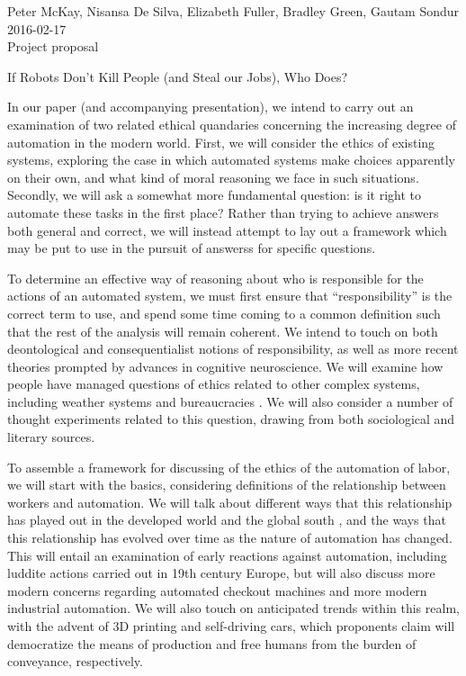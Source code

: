 \documentclass{article}
\begin{document}

\begin{center}
Peter McKay, Nisansa De Silva, Elizabeth Fuller, Bradley Green, Gautam Sondur\\
2016-02-17\\
Project proposal\\
\end{center}

\bigskip
{\Large If Robots Don’t Kill People (and Steal our Jobs), Who Does?}

In our paper (and accompanying presentation), we intend to carry out an 
examination of two related ethical quandaries concerning the increasing 
degree\cite{frey2013future} of automation in the modern world.  First, 
we will consider the ethics of existing systems, exploring the case in 
which automated systems make choices apparently
\cite{johnson2008computers} on their own, and what kind of moral 
reasoning we face in such situations.  Secondly, we will ask a somewhat 
more fundamental question: is it right to automate these tasks in the 
first place?  Rather than trying to achieve answers both general and 
correct, we will instead attempt to lay out a framework which may be 
put to use in the pursuit of answerss for specific questions.


To determine an effective way of reasoning about who is responsible for 
the actions of an automated system, we must first ensure that 
``responsibility'' is the correct term to use, and spend some time 
coming to a common definition such that the rest of the analysis will 
remain coherent.  We intend to touch on both deontological and 
consequentialist notions of responsibility, as well as more recent 
theories prompted by advances in cognitive neuroscience.  We will 
examine how people have managed questions of ethics related to other 
complex systems, including weather systems and bureaucracies
\cite{miller2008collective}.  We will also consider a number of thought 
experiments related to this question, drawing from both sociological 
and literary\cite{bostrom2003ethical} sources.


To assemble a framework for discussing of the ethics of the automation 
of labor, we will start with the basics, considering definitions of the 
relationship between workers and automation\cite{marx1867strife}.  We 
will talk about different ways that this relationship has played out 
in the developed world and the global south
\cite{kenarougluimplications, alcorta1995impact}, and the ways that 
this relationship has evolved over time as the nature of automation 
has changed. This will entail an examination of early reactions against 
automation, including luddite actions carried out in 19th century 
Europe, but will also discuss more modern concerns regarding automated 
checkout machines and more modern industrial automation.  We will also 
touch on anticipated trends\cite{goodall2014ethical} within this realm, 
with the advent of 3D printing and self-driving cars, which proponents 
claim will democratize the means of production and free humans from the 
burden of conveyance, respectively.



\end{document}
